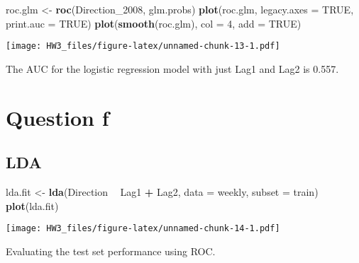 \documentclass[]{article}
\newenvironment{Shaded}{\begin{snugshade}}{\end{snugshade}}
\newcommand{\KeywordTok}[1]{\textcolor[rgb]{0.13,0.29,0.53}{\textbf{#1}}}
\newcommand{\DataTypeTok}[1]{\textcolor[rgb]{0.13,0.29,0.53}{#1}}
\newcommand{\DecValTok}[1]{\textcolor[rgb]{0.00,0.00,0.81}{#1}}
\newcommand{\StringTok}[1]{\textcolor[rgb]{0.31,0.60,0.02}{#1}}
\newcommand{\OtherTok}[1]{\textcolor[rgb]{0.56,0.35,0.01}{#1}}
\newcommand{\OperatorTok}[1]{\textcolor[rgb]{0.81,0.36,0.00}{\textbf{#1}}}
\newcommand{\NormalTok}[1]{#1}
\begin{document}
\begin{Shaded}
\begin{Highlighting}[]
\NormalTok{roc.glm <-}\StringTok{ }\KeywordTok{roc}\NormalTok{(Direction_}\DecValTok{2008}\NormalTok{, glm.probs)}
\KeywordTok{plot}\NormalTok{(roc.glm, }\DataTypeTok{legacy.axes =} \OtherTok{TRUE}\NormalTok{, }\DataTypeTok{print.auc =} \OtherTok{TRUE}\NormalTok{)}
\KeywordTok{plot}\NormalTok{(}\KeywordTok{smooth}\NormalTok{(roc.glm), }\DataTypeTok{col =} \DecValTok{4}\NormalTok{, }\DataTypeTok{add =} \OtherTok{TRUE}\NormalTok{)}
\end{Highlighting}
\end{Shaded}

\texttt{[image: HW3\_files/figure-latex/unnamed-chunk-13-1.pdf]}

The AUC for the logistic regression model with just Lag1 and Lag2 is
0.557.

\section{Question f}\label{question-f}

\subsection{LDA}\label{lda}

\begin{Shaded}
\begin{Highlighting}[]
\NormalTok{lda.fit <-}\StringTok{ }\KeywordTok{lda}\NormalTok{(Direction }\OperatorTok{~}\StringTok{ }\NormalTok{Lag1 }\OperatorTok{+}\StringTok{ }\NormalTok{Lag2, }\DataTypeTok{data =}\NormalTok{ weekly, }\DataTypeTok{subset =}\NormalTok{ train)}
\KeywordTok{plot}\NormalTok{(lda.fit)}
\end{Highlighting}
\end{Shaded}

\texttt{[image: HW3\_files/figure-latex/unnamed-chunk-14-1.pdf]}

Evaluating the test set performance using ROC.

\begin{Shaded}
\end{Shaded}
\end{document}
